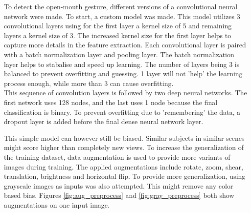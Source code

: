 \documentclass{report}
\begin{document}
To detect the open-mouth gesture, different versions of a convolutional neural network were made. To start, a custom model was made. This model utilizes 3 convolutional layers using for the first layer a kernel size of 5 and remaining layers a kernel size of 3. The increased kernel size for the first layer helps to capture more details in the feature extraction. Each convolutional layer is paired with a batch normalization layer and pooling layer. The batch normalization layer helps to stabalise and speed up learning. The number of layers being 3 is balanced to prevent overfitting and guessing. 1 layer will not 'help' the learning process enough, while more than 3 can cause overfitting.\\
This sequence of convolution layers is followed by two deep neural networks. The first network uses 128 nodes, and the last uses 1 node because the final classification is binary.
To prevent overfitting due to 'remembering' the data, a dropout layer is added before the final dense neural network layer.\\
\newline

This simple model can however still be biased. Similar subjects in similar scenes might score higher than completely new views. To increase the generalization of the training dataset, data augmentation is used to provide more variants of images during training. The applied augmentations include rotate, zoom, shear, translation, brightness and horizontal flip.  To provide more generalization, using grayscale images as inputs was also attempted. This might remove any color based bias. Figures \ref{fig:aug_preprocess} and \ref{fig:gray_preprocess} both show augmentations on one input image.\\
\newline
\end{document}
